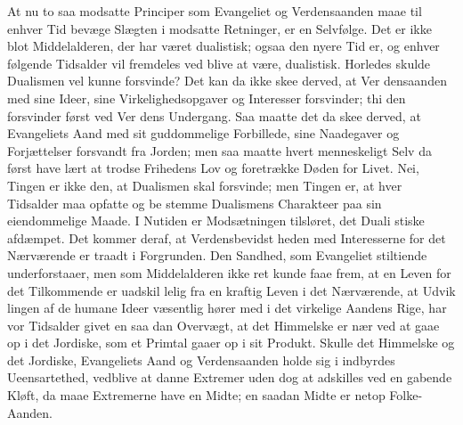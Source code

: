 \documentclass[12pt]{book}
\newcommand{\opage}[1]{\marginnote{\footnotesize\textit{[#1]}}}
\begin{document}
At nu to saa modsatte Principer som Evangeliet og
Verdensaanden maae til enhver Tid bevæge Slægten i
modsatte Retninger, er en Selvfølge. Det er ikke blot
Middelalderen, der har været dualistisk; ogsaa den nyere
Tid er, og enhver følgende Tidsalder vil fremdeles ved\-%
blive at være, dualistisk. Horledes skulde Dualismen vel
kunne forsvinde? Det kan da ikke skee derved, at Ver\-%
densaanden med sine Ideer, sine Virkelighedsopgaver og
Interesser forsvinder; thi den forsvinder først ved Ver\-%
dens Undergang. Saa maatte det da skee derved, at
Evangeliets Aand med sit guddommelige Forbillede, sine
Naadegaver og Forjættelser forsvandt fra Jorden; men
saa maatte hvert menneskeligt Selv da først have lært at
trodse Frihedens Lov og foretrække Døden for Livet.
Nei, Tingen er ikke den, at Dualismen skal forsvinde;
men Tingen er, at hver Tidsalder maa opfatte og be\-%
stemme Dualismens Charakteer paa sin eiendommelige
Maade. I Nutiden er Modsætningen tilsløret, det Duali\-%
stiske afdæmpet. Det kommer deraf, at Verdensbevidst\-%
heden med Interesserne for det Nærværende er traadt i
Forgrunden. Den Sandhed, som Evangeliet stiltiende
underforstaaer, men som Middelalderen ikke ret kunde
faae frem, at en Leven for det Tilkommende er uadskil\-%
lelig fra en kraftig Leven i det Nærværende, at Udvik\-%
\opage{47}\setcounter{footnote}{0}%
lingen af de humane Ideer væsentlig hører med i det
virkelige Aandens Rige, har vor Tidsalder givet en saa\-%
dan Overvægt, at det Himmelske er nær ved at gaae op
i det Jordiske, som et Primtal gaaer op i sit Produkt.
Skulle det Himmelske og det Jordiske, Evangeliets Aand
og Verdensaanden holde sig i indbyrdes Ueensartethed,
vedblive at danne Extremer uden dog at adskilles ved
en gabende Kløft, da maae Extremerne have en Midte;
en saadan Midte er netop Folke-Aanden.
\end{document}
